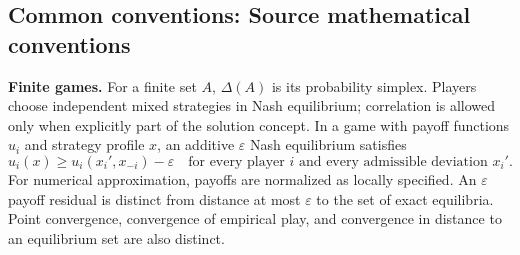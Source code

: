 \documentclass[11pt,a4paper]{article}
\begin{document}


\par\endgroup

\subsection*{Common conventions: Source mathematical conventions}

\textbf{Finite games.} For a finite set $A$, $\Delta(A)$ is its probability
simplex. Players choose independent mixed strategies in Nash equilibrium;
correlation is allowed only when explicitly part of the solution concept.
In a game with payoff functions $u_i$ and strategy profile $x$, an additive
$\varepsilon$ Nash equilibrium satisfies
\[
 u_i(x)\geq u_i(x_i',x_{-i})-\varepsilon
 \quad\text{for every player $i$ and every admissible deviation $x_i'$}.
\]
For numerical approximation, payoffs are normalized as locally specified.
An $\varepsilon$ payoff residual is distinct from distance at most
$\varepsilon$ to the set of exact equilibria. Point convergence, convergence
of empirical play, and convergence in distance to an equilibrium set are
also distinct.
\end{document}

